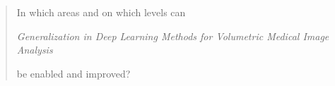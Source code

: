     \begin{quote}
        \centering \Large
        In which areas and on which levels can

        \noindent \emph{Generalization in Deep Learning Methods for Volumetric Medical Image Analysis}

        \noindent be enabled and improved?
    \end{quote}









